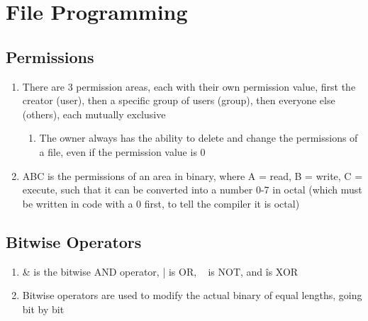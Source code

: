\documentclass[11 pt, twoside]{article}
\begin{document}
\section{File Programming}
\subsection{Permissions}
\begin{enumerate}
\item There are 3 permission areas, each with their own permission value, first the creator (user), then a specific group of users (group), then everyone else (others), each mutually exclusive
\begin{enumerate}
\item The owner always has the ability to delete and change the permissions of a file, even if the permission value is 0
\end{enumerate}
\item ABC is the permissions of an area in binary, where A = read, B = write, C = execute, such that it can be converted into a number 0-7 in octal (which must be written in code with a 0 first, to tell the compiler it is octal)
\end{enumerate}

\subsection{Bitwise Operators}
\begin{enumerate}
\item \& is the bitwise AND operator, | is OR, ~ is NOT, and \^ is XOR
\item Bitwise operators are used to modify the actual binary of equal lengths, going bit by bit
\end{enumerate}
\end{document}
